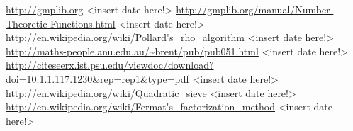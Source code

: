 \documentclass[paper=a4, fontsize=11pt,numbers=endperiod]{scrartcl} %
\numberwithin{equation}{section} %
\numberwithin{figure}{section} %
\numberwithin{table}{section} %
\begin{document}
\begin{thebibliography}{9}

\url{http://gmplib.org} <insert date here!>
\url{http://gmplib.org/manual/Number-Theoretic-Functions.html} <insert date here!>
\url{http://en.wikipedia.org/wiki/Pollard's_rho_algorithm} <insert date here!>
\url{http://maths-people.anu.edu.au/~brent/pub/pub051.html} <insert date here!>
\url{http://citeseerx.ist.psu.edu/viewdoc/download?doi=10.1.1.117.1230&rep=rep1&type=pdf} <insert date here!>
\url{http://en.wikipedia.org/wiki/Quadratic_sieve} <insert date here!>
\url{http://en.wikipedia.org/wiki/Fermat's_factorization_method} <insert date here!>
\end{thebibliography}
\end{document}
